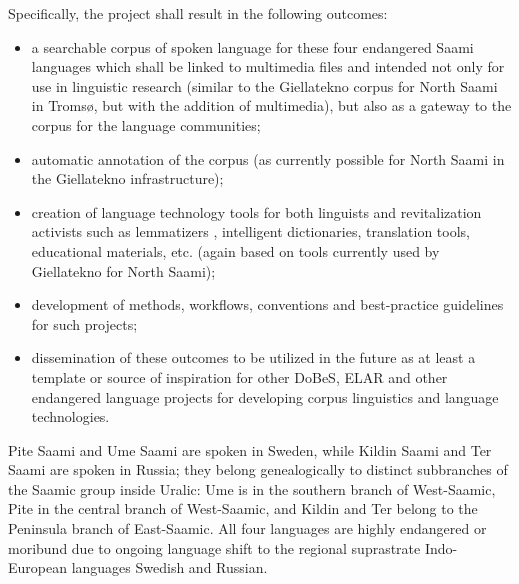 \documentclass[a4paper,12pt]{article}
\begin{document}
Specifically, the project shall result in the following outcomes:%
\begin{itemize}
\item a searchable corpus of spoken language for these four endangered Saami languages which shall be linked to multimedia files and intended not only %
for use in linguistic research (similar to the Giellatekno corpus for North Saami in Tromsø, but with the addition of multimedia), but also as a gateway to the corpus for the language communities;
\item automatic annotation of the corpus (as currently possible for North Saami in the Giellatekno infrastructure);
\item creation of language technology tools for both linguists and revitalization activists such as lemmatizers%
, intelligent dictionaries, translation tools, educational materials, etc. (again based on tools currently used by Giellatekno for North Saami); 
\item development of methods, workflows, conventions and best-practice guidelines for such projects;
\item dissemination of these outcomes to be utilized in the future as at least a template or source of inspiration for other DoBeS, ELAR and other endangered language projects for developing corpus linguistics and language technologies.
\end{itemize}

Pite Saami and Ume Saami are spoken in Sweden, while Kildin Saami and Ter Saami are spoken in Russia; they belong genealogically to distinct subbranches of the Saamic group inside Uralic: Ume is in the southern branch of West-Saamic, Pite in the central branch of West-Saamic, and Kildin and Ter belong to the Peninsula branch of East-Saamic. All four languages are highly endangered or moribund due to ongoing language shift to the regional suprastrate Indo-European languages Swedish and Russian.
\end{document}
